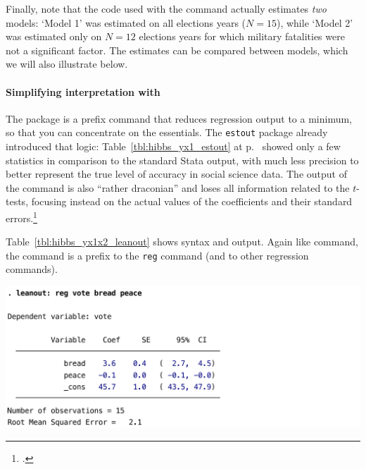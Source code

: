 Finally, note that the code used with the  command actually estimates \emph{two} models: `Model 1' was estimated on all elections years ($N=15$), while `Model 2' was estimated only on $N=12$ elections years for which military fatalities were not a significant factor. The estimates can be compared between models, which we will also illustrate below.

	
	\paragraph{Simplifying interpretation with }%
	\label{sec:leanout}
	The  package is a prefix command that reduces regression output to a minimum, so that you can concentrate on the essentials. The \texttt{estout} package already introduced that logic: Table~\ref{tbl:hibbs_yx1_estout} at p.~\pageref{tbl:hibbs_yx1_estout} showed only a few statistics in comparison to the standard Stata output, with much less precision to better represent the true level of accuracy in social science data. The output of the  command is also ``rather draconian'' and loses all information related to the $t$-tests, focusing instead on the actual values of the coefficients and their standard errors.\footcite{Beck:2011a}

	Table~\ref{tbl:hibbs_yx1x2_leanout} shows  syntax and output. Again like  command, the  command is a prefix to the \texttt{reg} command (and to other regression commands).
	
	\begin{table}[htp]
		\includegraphics[scale=.5]{images/hibbs_yx1x2_leanout.pdf}

	  	\caption[Extract from  output (4): Simplified regression output]{\label{tbl:hibbs_yx1x2_leanout}%
      Extract from  output (4): %
      Simplified regression output using the  prefix. %
      \hibbs}
	\end{table}%
	
